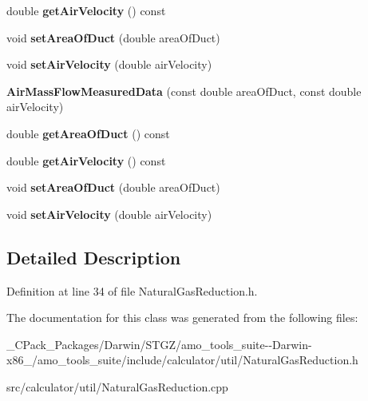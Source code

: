 \begin{DoxyCompactItemize}
\mbox{\label{class_air_mass_flow_measured_data_a11b1123e2339a9c54d91ca6bfe07b24f}} 
double {\bfseries get\+Air\+Velocity} () const
\item 
\mbox{\label{class_air_mass_flow_measured_data_a1720b401f48d2964014031dc05adca44}} 
void {\bfseries set\+Area\+Of\+Duct} (double area\+Of\+Duct)
\item 
\mbox{\label{class_air_mass_flow_measured_data_a3faf07853d690a6ef6475279bf9992e5}} 
void {\bfseries set\+Air\+Velocity} (double air\+Velocity)
\item 
\mbox{\label{class_air_mass_flow_measured_data_af2689f6331303c77fbba7d58ea172d56}} 
{\bfseries Air\+Mass\+Flow\+Measured\+Data} (const double area\+Of\+Duct, const double air\+Velocity)
\item 
\mbox{\label{class_air_mass_flow_measured_data_af1087dd51550483665405e70de95cd2b}} 
double {\bfseries get\+Area\+Of\+Duct} () const
\item 
\mbox{\label{class_air_mass_flow_measured_data_a11b1123e2339a9c54d91ca6bfe07b24f}} 
double {\bfseries get\+Air\+Velocity} () const
\item 
\mbox{\label{class_air_mass_flow_measured_data_a1720b401f48d2964014031dc05adca44}} 
void {\bfseries set\+Area\+Of\+Duct} (double area\+Of\+Duct)
\item 
\mbox{\label{class_air_mass_flow_measured_data_a3faf07853d690a6ef6475279bf9992e5}} 
void {\bfseries set\+Air\+Velocity} (double air\+Velocity)
\end{DoxyCompactItemize}


\subsection{Detailed Description}


Definition at line 34 of file Natural\+Gas\+Reduction.\+h.



The documentation for this class was generated from the following files\+:\begin{DoxyCompactItemize}
\item 
\+\_\+\+C\+Pack\+\_\+\+Packages/\+Darwin/\+S\+T\+G\+Z/amo\+\_\+tools\+\_\+suite-\/-\/\+Darwin-\/x86\+\_/amo\+\_\+tools\+\_\+suite/include/calculator/util/Natural\+Gas\+Reduction.\+h\item 
src/calculator/util/Natural\+Gas\+Reduction.\+cpp\end{DoxyCompactItemize}

